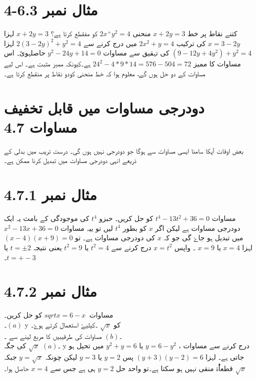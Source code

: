 \section{4-6.3  مثال نمبر }
                              کتنے نقاط پر خط  $  x+2y=3 $   منحنی    $ 2x^+y^2=4  $ کو مفقطع کرتا ہے؟  $  x+2y=3 $  لہزا  $ x=3-2y $ کی ترکیب   $2x^2+y=4 $  ميں درج کرنے سے   $     2(3-2y)^2+y^2=4  $  لہزا  $  (9-12y+4y^2)+y^2=4 $     کی تہقيق سے مساوات   $  y^2-24y+14=0   $   حاصلہوئ۔
   اس مساوات کا ممیز    $   24^2-4*9*14=576-504=72  $       ہے۔کيونکہ  مميز مثبت ہے۔ اس ليے مساوات کے دو حل ہوں گے، معلوم ہوا کہ خط منحنی کودو نقاط پر منقطع کرتا ہے۔
   
\section{ دودرجی مساوات ميں قابل تخفيف مساوات 4.7}

  بعض اوقات آپکا سامنا ايسی مساوات سے ہوگا جو دودرجی نہيں ہوں گی۔ درست تريب ميں بدلی کے ذريعے انہی دودرجی مساوات ميں تبديل کرنا ممکن ہے۔
  
\section{ 4.7.1  مثال نمبر       }
   مساوات        $       t^4-13t^2+36=0   $  کو حل کريں۔
   حبزو $ t^4 $   کی موجودگی کے بامث یہ ايک دودرجی مساوات ہے ليکن اگر $  x $  کو بطور   $  t^4 $  ليں تو ييہ مساوات  $  x^2-13x+36=0 $  ميں  تبديل ہو جاۓ گی جو کہ $ x$  کی دودرجی مساوات ہے۔
   تو $     (x-4)(x+9)=0  $  لہزا  $ x=4 $ يا $x = 9 $ ۔
   واپس $ x=t^2 $ درج کرنے سے $ t^2=4 $  يا $ t^2=9 $ يعنی نتيجہ $   t=\pm 2 $ يا $  t=+-3 $۔
   
\section{ 4.7.2   مثال نمبر     } 
                                                    مساوات  $   sqrt{x}=6-x\  $ کو حل کرين۔\\
                                        ۔$ (a)$ y  کو  $ \sqrt{x} $  ۔کيليۓ استعمال کرتے ہوۓ۔    \\
                                        ۔$( b)$  مساوات کی طرقيبيں کا مربع لينے سے ۔\\
 ۔$(a)$ $ \sqrt{x} $  کی جگہ  y درج کرنے سے مساوات ،  $ y=6-y^2 $   يا   $y^2+y=6$  ميں تحيل ہو جاتی ہے۔ لہزا   $ (y+3)(y-2)=6 $  پس   $ y=2 $   يا   $ y=3 $  ليکن چونکہ  $ y=\sqrt{x} $  جبکہ  $ \sqrt{x} $  قطعاُٰٰٰٰٰٰۃ منقی نہيں ہو سکتا ہے۔تو واحد حل $  y=2 $ ہی ہے جس سے  $   x=4 $ حاصل ہوا۔

